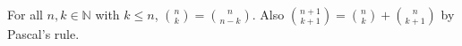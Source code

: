 For all $n, k \in \mathbb{N}$ with $k \leq n$, $\binom{n}{k} = \binom{n}{n - k}$.
Also $\binom{n + 1}{k + 1} = \binom{n}{k} + \binom{n}{k + 1}$ by Pascal's rule.